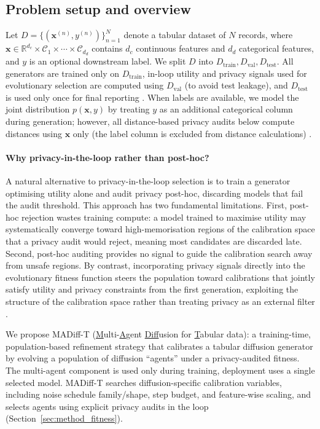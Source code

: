 \documentclass[preprint,12pt]{elsarticle}
\begin{document}
\subsection{Problem setup and overview}
Let $D=\{(\mathbf{x}^{(n)}, y^{(n)})\}_{n=1}^{N}$ denote a tabular dataset of $N$ records, where $\mathbf{x}\in\mathbb{R}^{d_c}\times\mathcal{C}_1\times\cdots\times\mathcal{C}_{d_d}$ contains $d_c$ continuous features and $d_d$ categorical features, and $y$ is an optional downstream label. We split $D$ into $D_{\text{train}},D_{\text{val}},D_{\text{test}}$. All generators are trained only on $D_{\text{train}}$, in-loop utility and privacy signals used for evolutionary selection are computed using $D_{\text{val}}$ (to avoid test leakage), and $D_{\text{test}}$ is used only once for final reporting \cite{Hernandez2025}. When labels are available, we model the joint distribution $p(\mathbf{x},y)$ by treating $y$ as an additional categorical column during generation; however, all distance-based privacy audits below compute distances using $\mathbf{x}$ only (the label column is excluded from distance calculations) \cite{Hyrup2025}.

\paragraph{Why privacy-in-the-loop rather than post-hoc?}
A natural alternative to privacy-in-the-loop selection is to 
train a generator optimising utility alone and audit privacy 
post-hoc, discarding models that fail the audit threshold. 
This approach has two fundamental limitations. First, 
post-hoc rejection wastes training compute: a model trained 
to maximise utility may systematically converge toward 
high-memorisation regions of the calibration space that 
a privacy audit would reject, meaning most candidates are 
discarded late. Second, post-hoc auditing provides no signal 
to guide the calibration search away from unsafe regions. 
By contrast, incorporating privacy signals directly into 
the evolutionary fitness function steers the population 
toward calibrations that jointly satisfy utility and privacy 
constraints from the first generation, exploiting the 
structure of the calibration space rather than treating 
privacy as an external filter \cite{Hernandez2025,Hyrup2025}.

We propose MADiff-T (\underline{M}ulti-\underline{A}gent \underline{Diff}usion for \underline{T}abular data): a training-time, population-based refinement strategy that calibrates a tabular diffusion generator by evolving a population of diffusion ``agents'' under a privacy-audited fitness. The multi-agent component is used only during training, deployment uses a single selected model. MADiff-T searches diffusion-specific calibration variables, including noise schedule family/shape, step budget, and feature-wise scaling, and selects agents using explicit privacy audits in the loop (Section~\ref{sec:method_fitness}).
\end{document}
